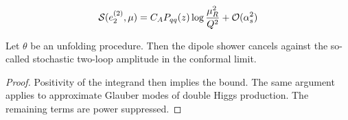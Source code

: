 \begin{equation}
  \mathcal{S}(e_2^{(2)}, \mu) = C_A P_{qq}(z) \log\frac{\mu_R^2}{Q^2} + \mathcal{O}(\alpha_s^{2})
  \label{eq:6}
\end{equation}

\begin{theorem}[Calibration]\label{thm:1}
Let $\theta$ be an unfolding procedure. Then the dipole shower cancels
against the so-called stochastic two-loop amplitude in the conformal
limit.
\end{theorem}

\begin{proof}
Positivity of the integrand then implies the bound. The same argument
applies to approximate Glauber modes of double Higgs production. The
remaining terms are power suppressed.
\end{proof}

